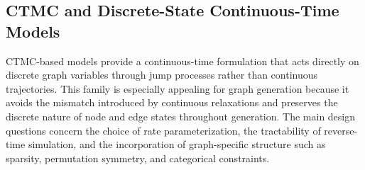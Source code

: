 \documentclass{article}
\begin{document}
\subsection{CTMC and Discrete-State Continuous-Time Models}
\label{sec:ctmc_models}

CTMC-based models provide a continuous-time formulation that acts directly on discrete graph variables through jump processes rather than continuous trajectories. This family is especially appealing for graph generation because it avoids the mismatch introduced by continuous relaxations and preserves the discrete nature of node and edge states throughout generation. The main design questions concern the choice of rate parameterization, the tractability of reverse-time simulation, and the incorporation of graph-specific structure such as sparsity, permutation symmetry, and categorical constraints.
\end{document}
